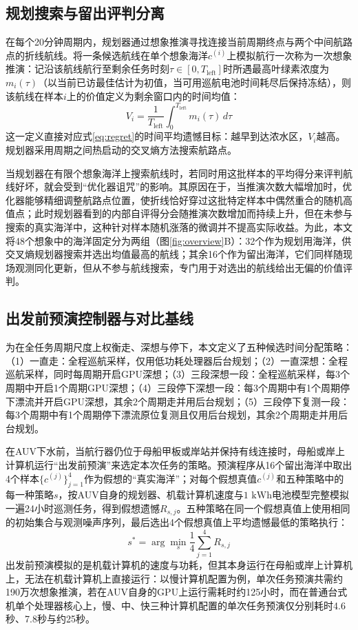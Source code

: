 \subsection{规划搜索与留出评判分离}

在每个20分钟周期内，规划器通过想象推演寻找连接当前周期终点与两个中间航路点的折线航线。将一条候选航线在单个想象海洋$c^{(i)}$上模拟航行一次称为一次想象推演：记沿该航线航行至剩余任务时刻$\tau \in [0, T_{\text{left}}]$时所遇最高叶绿素浓度为$m_i(\tau)$（以当前已访最佳估计为初值，当可用巡航电池时间耗尽后保持冻结），则该航线在样本$i$上的价值定义为剩余窗口内的时间均值：
\begin{equation}
  V_i = \frac{1}{T_{\text{left}}}\int_0^{T_{\text{left}}} m_i(\tau)\, d\tau
  \label{eq:route_value}
\end{equation}
这一定义直接对应式\eqref{eq:regret}的时间平均遗憾目标：越早到达浓水区，$V_i$越高。规划器采用周期之间热启动的交叉熵方法\cite{deboer2005cem}搜索航路点。

当规划器在有限个想象海洋上搜索航线时，若同时用这批样本的平均得分来评判航线好坏，就会受到“优化器诅咒”的影响\cite{smith2006curse, vanhasselt2010double}。其原因在于，当推演次数大幅增加时，优化器能够精细调整航路点位置，使折线恰好穿过这批特定样本中偶然重合的随机高值点；此时规划器看到的内部自评得分会随推演次数增加而持续上升，但在未参与搜索的真实海洋中，这种针对样本随机涨落的微调并不提高实际收益。为此，本文将48个想象中的海洋固定分为两组（图\ref{fig:overview}B）：32个作为规划用海洋，供交叉熵规划器搜索并选出均值最高的航线；其余16个作为留出海洋，它们同样随现场观测同化更新，但从不参与航线搜索，专门用于对选出的航线给出无偏的价值评判。

\subsection{出发前预演控制器与对比基线}

为在全任务周期尺度上权衡走、深想与停下，本文定义了五种候选时间分配策略：（1）一直走：全程巡航采样，仅用低功耗处理器后台规划；（2）一直深想：全程巡航采样，同时每周期开启GPU深想；（3）三段深想一段：全程巡航采样，每3个周期中开启1个周期GPU深想；（4）三段停下深想一段：每3个周期中有1个周期停下漂流并开启GPU深想，其余2个周期走并用后台规划；（5）三段停下复测一段：每3个周期中有1个周期停下漂流原位复测且仅用后台规划，其余2个周期走并用后台规划。

在AUV下水前，当航行器仍位于母船甲板或岸站并保持有线连接时，母船或岸上计算机运行“出发前预演”来选定本次任务的策略。预演程序从16个留出海洋中取出4个样本$\{c^{(j)}\}_{j=1}^4$作为假想的“真实海洋”；对每个假想真值$c^{(j)}$和五种策略中的每一种策略$s$，按AUV自身的规划器、机载计算机速度与$1\text{ kWh}$电池模型完整模拟一遍24小时巡测任务，得到假想遗憾$R_{s,j}$。五种策略在同一个假想真值上使用相同的初始集合与观测噪声序列，最后选出4个假想真值上平均遗憾最低的策略执行：
\begin{equation}
  s^* = \arg\min_{s} \frac{1}{4}\sum_{j=1}^4 R_{s,j}
  \label{eq:rehearsal}
\end{equation}
出发前预演模拟的是机载计算机的速度与功耗，但其本身运行在母船或岸上计算机上，无法在机载计算机上直接运行：以慢计算机配置为例，单次任务预演共需约190万次想象推演，若在AUV自身的GPU上运行需耗时约125小时，而在普通台式机单个处理器核心上，慢、中、快三种计算机配置的单次任务预演仅分别耗时4.6秒、7.8秒与约25秒。

